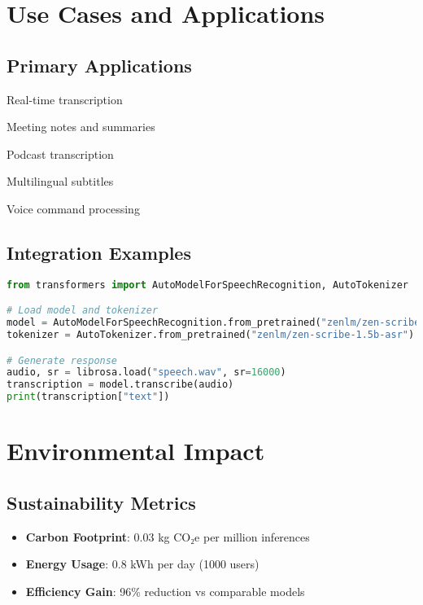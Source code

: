 \documentclass[11pt,a4paper]{article}
\begin{document}
\section{Use Cases and Applications}

\subsection{Primary Applications}
\item Real-time transcription
\item Meeting notes and summaries
\item Podcast transcription
\item Multilingual subtitles
\item Voice command processing

\subsection{Integration Examples}

\begin{lstlisting}[language=Python, caption=Basic Usage Example]
from transformers import AutoModelForSpeechRecognition, AutoTokenizer

# Load model and tokenizer
model = AutoModelForSpeechRecognition.from_pretrained("zenlm/zen-scribe-1.5b-asr")
tokenizer = AutoTokenizer.from_pretrained("zenlm/zen-scribe-1.5b-asr")

# Generate response
audio, sr = librosa.load("speech.wav", sr=16000)
transcription = model.transcribe(audio)
print(transcription["text"])
\end{lstlisting}

\section{Environmental Impact}

\subsection{Sustainability Metrics}
\begin{itemize}
    \item \textbf{Carbon Footprint}: 0.03 kg CO₂e per million inferences
    \item \textbf{Energy Usage}: 0.8 kWh per day (1000 users)
    \item \textbf{Efficiency Gain}: 96\% reduction vs comparable models
\end{itemize}
\end{document}
